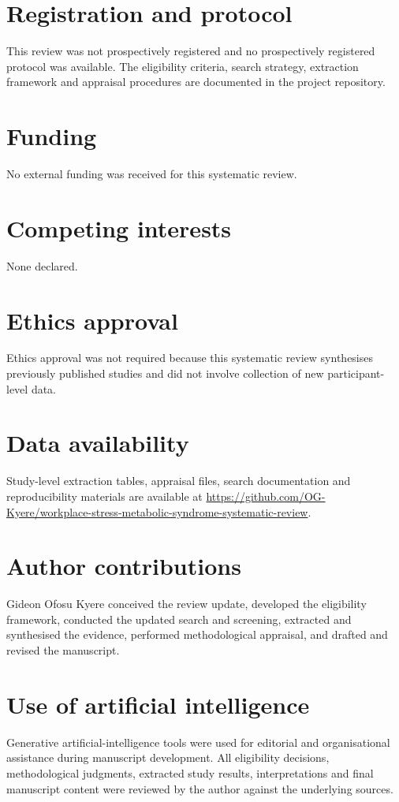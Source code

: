 \documentclass[11pt]{article}
\begin{document}
\section*{Registration and protocol}
This review was not prospectively registered and no prospectively registered protocol was available. The eligibility criteria, search strategy, extraction framework and appraisal procedures are documented in the project repository.

\section*{Funding}
No external funding was received for this systematic review.

\section*{Competing interests}
None declared.

\section*{Ethics approval}
Ethics approval was not required because this systematic review synthesises previously published studies and did not involve collection of new participant-level data.

\section*{Data availability}
Study-level extraction tables, appraisal files, search documentation and reproducibility materials are available at \url{https://github.com/OG-Kyere/workplace-stress-metabolic-syndrome-systematic-review}.

\section*{Author contributions}
Gideon Ofosu Kyere conceived the review update, developed the eligibility framework, conducted the updated search and screening, extracted and synthesised the evidence, performed methodological appraisal, and drafted and revised the manuscript.

\section*{Use of artificial intelligence}
Generative artificial-intelligence tools were used for editorial and organisational assistance during manuscript development. All eligibility decisions, methodological judgments, extracted study results, interpretations and final manuscript content were reviewed by the author against the underlying sources.



\end{document}
